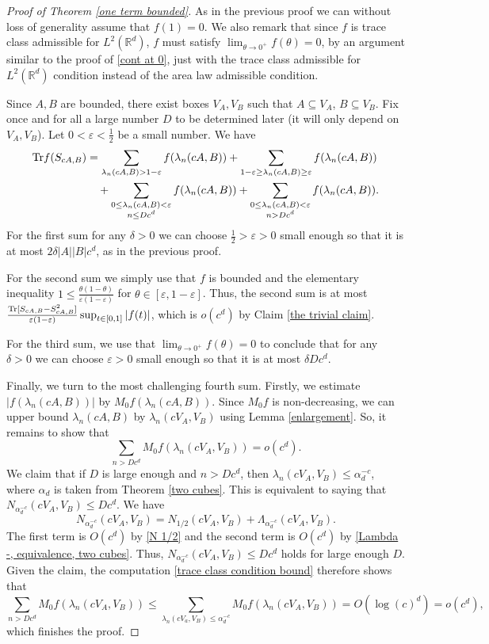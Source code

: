 \documentclass[12pt]{amsart}
\numberwithin{equation}{section}
\newcommand{\R}{\mathbb{R}}
\newcommand{\eps}{\varepsilon}
\begin{document}
\begin{proof}[Proof of Theorem \ref{one term bounded}]
As in the previous proof we can without loss of generality assume that $f(1) = 0$. We also remark that since $f$ is trace class admissible for $L^2(\R^d)$, $f$ must satisfy $\lim_{\theta\to 0^+} f(\theta) =0$, by an argument similar to the proof of \eqref{cont at 0}, just with the trace class admissible for $L^2(\R^d)$ condition instead of the area law admissible condition.

Since $A, B$ are bounded, there exist boxes $V_A, V_B$ such that $A\subseteq V_A$, $B\subseteq V_B$. Fix once and for all a large number $D$ to be determined later (it will only depend on $V_A, V_B$). Let $0 < \eps < \frac{1}{2}$ be a small number. We have
\begin{align*}
{\rm Tr}f(S_{cA,B}) &= \sum_{\lambda_n(cA, B) > 1-\eps}f(\lambda_n(cA,B))  +\sum_{1-\eps\ge\lambda_n(cA, B) \geq \eps }f(\lambda_n(cA,B))\\
&\quad +\sum_{\substack{0 \le \lambda_n(cA,B)< \eps \\ n\le Dc^d}} f(\lambda_n(cA,B))+ \sum_{\substack{0 \le \lambda_n(cA,B)< \eps\\ n> Dc^d}} f(\lambda_n(cA,B)).
\end{align*}
For the first sum for any $\delta > 0$ we can choose $\frac{1}{2}>\eps > 0$ small enough so that it is at most $2\delta |A| |B| c^d$, as in the previous proof. 

For the second sum we simply use that $f$ is bounded and the elementary inequality $1\leq \frac{\theta(1-\theta)}{\eps(1-\eps)}$ for $\theta\in [\eps, 1-\eps]$. Thus, the second sum is at most $\frac{ {\rm Tr}[S_{cA,B}-S_{cA,B}^2]}{\eps(1-\eps)}\sup_{t\in [0,1]} |f(t)|$, which is $o(c^d)$ by Claim \ref{the trivial claim}. 

For the third sum, we use that $\lim_{\theta\to 0^+} f(\theta) =0$ to conclude that for any $\delta > 0$ we can choose $\eps > 0$ small enough so that it is at most $\delta Dc^d$.

Finally, we turn to the most challenging fourth sum. Firstly, we estimate $|f(\lambda_n(cA, B))|$ by $M_0f(\lambda_n(cA,B))$. Since $M_0f$ is non-decreasing, we can upper bound $\lambda_n(cA,B)$ by $\lambda_n(cV_A, V_B)$ using Lemma \ref{enlargement}. So, it remains to show that
$$\sum_{n > Dc^d} M_0f(\lambda_n(cV_A, V_B)) = o(c^d).$$
We claim that if $D$ is large enough and $n> D c^d$, then $\lambda_n(cV_A, V_B) \le \alpha_d^{-c}$, where $\alpha_d$ is taken from Theorem \ref{two cubes}. This is equivalent to saying that $N_{\alpha_d^{-c}}(cV_A, V_B)\le Dc^d$. We have
$$N_{\alpha_d^{-c}}(cV_A, V_B) = N_{1/2}(cV_A,V_B) + \Lambda_{\alpha_d^{-c}}(cV_A,V_B).$$
The first term is $O(c^d)$ by \eqref{N 1/2} and the second term is $O(c^d)$ by \eqref{Lambda -, equivalence, two cubes}. Thus, $N_{\alpha_d^{-c}}(cV_A, V_B)\le Dc^d$ holds for large enough $D$. Given the claim, the computation \eqref{trace class condition bound} therefore shows that
\[
\sum_{n > Dc^d} M_0f(\lambda_n(cV_A, V_B)) \leq \sum_{\lambda_n(cV_a,V_B) \leq \alpha_d^{-c}}  M_0f(\lambda_n(cV_A, V_B)) = O(\log(c)^d) = o(c^d),
\]
which finishes the proof.
\end{proof}
\end{document}
